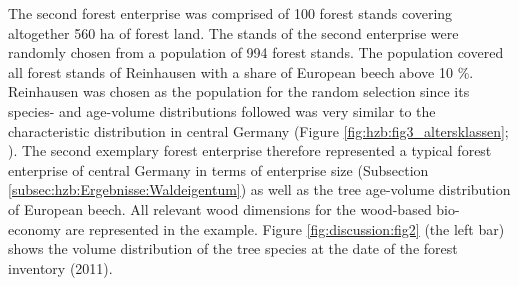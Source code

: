 The second forest enterprise was comprised of 100 forest stands covering altogether 560 ha of forest land. The stands of the second enterprise were randomly chosen from a population of 994 forest stands. The population covered all forest stands of Reinhausen with a share of European beech above 10 \%. Reinhausen was chosen as the population for the random selection since its species- and age-volume distributions followed was very similar to the characteristic distribution in central Germany (Figure \ref{fig:hzb:fig3_altersklassen}; \citealp{nlf_2017}). The second exemplary forest enterprise therefore represented a typical forest enterprise of central Germany in terms of enterprise size (Subsection \ref{subsec:hzb:Ergebnisse:Waldeigentum}) as well as the tree age-volume distribution of European beech. All relevant wood dimensions for the wood-based bio-economy are represented in the example. Figure \ref{fig:discussion:fig2} (the left bar) shows the volume distribution of the tree species at the date of the forest inventory (2011).

